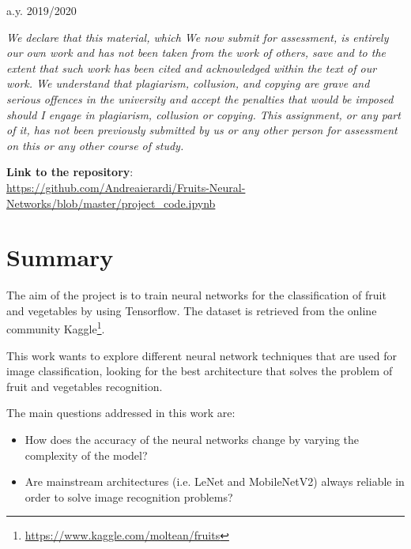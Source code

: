 \documentclass[10pt,english, openany]{book}
\begin{document}
\begin{titlepage}
    \vspace{0.5cm}
		
	{\normalsize a.y. 2019/2020 \par}
	
	\pagebreak

\end{titlepage}
\newpage
\textit{We declare that this material, which We now submit for assessment, is entirely our own work and has not been taken from the work of others, save and to the extent that such work has been cited and acknowledged within the text of our work. We understand that plagiarism, collusion, and copying are grave and serious offences in the university and accept the penalties that would be imposed should I engage in plagiarism, collusion or copying. This assignment, or any part of it, has not been previously submitted by us or any other person for assessment on this or any other course of study.}

\vspace{3cm}

\textbf{Link to the repository}: \\ \href{https://github.com/Andreaierardi/Fruits-Neural-Networks/blob/master/project_code.ipynb}{https://github.com/Andreaierardi/Fruits-Neural-Networks/blob/master/project\_code.ipynb}
\tableofcontents{}
\listoffigures
\mainmatter
\chapter{Summary}\label{chapt:sum}


The aim of the project is to train neural networks for the classification of fruit and vegetables by using Tensorflow. The dataset is retrieved from the online community Kaggle\footnote{\href{https://www.kaggle.com/moltean/fruits}{https://www.kaggle.com/moltean/fruits}}.

This work wants to explore different neural network techniques that are used for image classification, looking for the best architecture that solves the problem of fruit and vegetables recognition.

The main questions addressed in this work are:

\begin{itemize}
\item How does the accuracy of the neural networks change by varying the complexity of the model?

\item Are mainstream architectures (i.e. LeNet and MobileNetV2) always reliable in order to solve image recognition problems?
\end{itemize}
\end{document}
